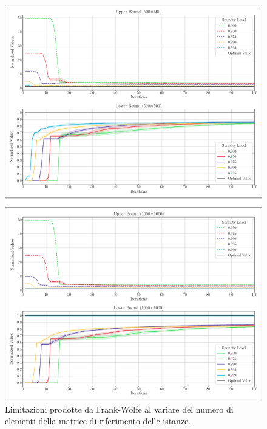 \begin{figure}[H]
    \centering
    \includegraphics[width=412pt]{assets/figures/size_lineplot2.1.pdf}
    \caption{Limitazioni prodotte da Frank-Wolfe al variare del numero di elementi della matrice di riferimento delle
    istanze.}
    \label{fig:size_lineplot}
\end{figure}

